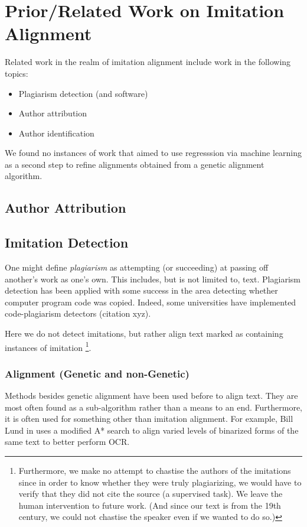 \section {Prior/Related Work on Imitation Alignment}
Related work in the realm of imitation alignment include work in the following topics:
	\begin{itemize}
		\item Plagiarism detection (and software)
		\item Author attribution
		\item Author identification
	\end{itemize}

We found no instances of work that aimed to use regresssion via machine learning as a second step to refine alignments obtained from a genetic alignment algorithm.%


\subsection{Author Attribution}

\subsection{Imitation Detection}
One might define \textit{plagiarism} as attempting (or succeeding) at passing off another's work as one's own. This includes, but is not limited to, text. Plagiarism detection has been applied with some success in the area detecting whether computer program code was copied. Indeed, some universities have implemented code-plagiarism detectors (citation xyz).

Here we do not detect imitations, but rather align text marked as containing instances of imitation \footnote{Furthermore, we make no attempt to chastise the authors of the imitations since in order to know whether they were truly plagiarizing, we would have to verify that they did not cite the source (a supervised task). We leave the human intervention to future work. (And since our text is from the 19th century, we could not chastise the speaker even if we wanted to do so.)}.

\subsubsection{Alignment (Genetic and non-Genetic)}
Methods besides genetic alignment have been used before to align text. They are most often found as a sub-algorithm rather than a means to an end. Furthermore, it is often used for something other than imitation alignment. For example, Bill Lund in \cite{lund_binarization} uses a modified A* search to align varied levels of binarized forms of the same text to better perform OCR.

